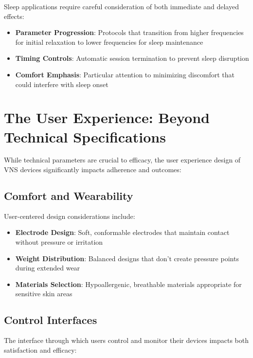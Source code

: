 \documentclass[
  Letterpaper,
]{scrbook}
\providecommand{\tightlist}{%
  \setlength{\itemsep}{0pt}\setlength{\parskip}{0pt}}\usepackage{longtable,booktabs,array}
\begin{document}
Sleep applications require careful consideration of both immediate and
delayed effects:

\begin{itemize}
\tightlist
\item
  \textbf{Parameter Progression}: Protocols that transition from higher
  frequencies for initial relaxation to lower frequencies for sleep
  maintenance
\item
  \textbf{Timing Controls}: Automatic session termination to prevent
  sleep disruption
\item
  \textbf{Comfort Emphasis}: Particular attention to minimizing
  discomfort that could interfere with sleep onset
\end{itemize}

\section{The User Experience: Beyond Technical
Specifications}\label{the-user-experience-beyond-technical-specifications}

While technical parameters are crucial to efficacy, the user experience
design of VNS devices significantly impacts adherence and outcomes:

\subsection{Comfort and Wearability}\label{comfort-and-wearability}

User-centered design considerations include:

\begin{itemize}
\tightlist
\item
  \textbf{Electrode Design}: Soft, conformable electrodes that maintain
  contact without pressure or irritation
\item
  \textbf{Weight Distribution}: Balanced designs that don't create
  pressure points during extended wear
\item
  \textbf{Materials Selection}: Hypoallergenic, breathable materials
  appropriate for sensitive skin areas
\end{itemize}

\subsection{Control Interfaces}\label{control-interfaces}

The interface through which users control and monitor their devices
impacts both satisfaction and efficacy:
\end{document}
